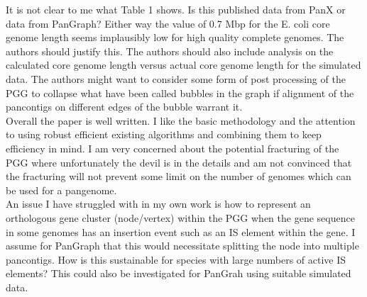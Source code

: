 \documentclass{article}
\begin{document}
It is not clear to me what Table 1 shows. Is this published data from PanX or data from PanGraph? Either way the value of 0.7 Mbp for the E. coli core genome length seems implausibly low for high quality complete genomes. The authors should justify this. The authors should also include analysis on the calculated core genome length versus actual core genome length for the simulated data. The authors might want to consider some form of post processing of the PGG to collapse what have been called bubbles in the graph if alignment of the pancontigs on different edges of the bubble warrant it.\\

Overall the paper is well written. I like the basic methodology and the attention to using robust efficient existing algorithms and combining them to keep efficiency in mind. I am very concerned about the potential fracturing of the PGG where unfortunately the devil is in the details and am not convinced that the fracturing will not prevent some limit on the number of genomes which can be used for a pangenome.\\

An issue I have struggled with in my own work is how to represent an orthologous gene cluster (node/vertex) within the PGG when the gene sequence in some genomes has an insertion event such as an IS element within the gene. I assume for PanGraph that this would necessitate splitting the node into multiple pancontigs. How is this sustainable for species with large numbers of active IS elements? This could also be investigated for PanGrah using suitable simulated data.
\end{document}

